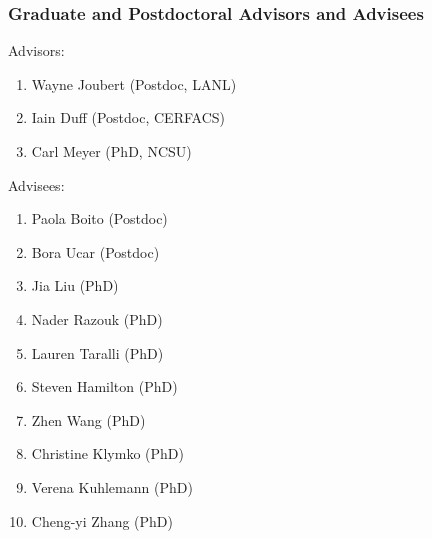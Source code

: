 \subsubsection*{Graduate and Postdoctoral Advisors and Advisees}
\vspace*{-1ex}
Advisors:
\begin{enumerate}
\item Wayne Joubert (Postdoc, LANL)
\item Iain Duff (Postdoc, CERFACS)
\item Carl Meyer (PhD, NCSU)
\end{enumerate} 
\vspace*{-1ex}
Advisees: 
\begin{enumerate}
\item Paola Boito (Postdoc) 
\item Bora Ucar (Postdoc) 
\item Jia Liu (PhD)
\item Nader Razouk (PhD)
\item Lauren Taralli (PhD)
\item Steven Hamilton (PhD)
\item Zhen Wang (PhD)
\item Christine Klymko (PhD)
\item Verena Kuhlemann (PhD)
\item Cheng-yi Zhang (PhD)
\end{enumerate}

\pagebreak
\endinput


